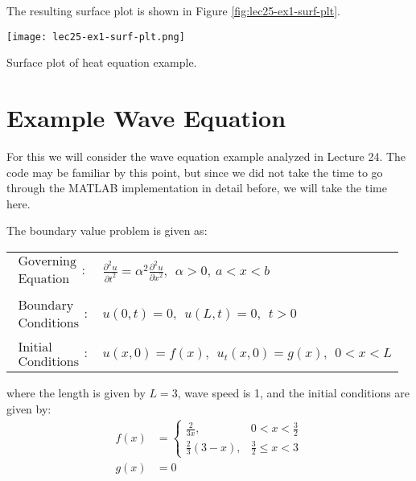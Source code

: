 \vspace{0.2cm}

\noindent The resulting surface plot is shown in Figure \ref{fig:lec25-ex1-surf-plt}.

\begin{marginfigure}
\texttt{[image: lec25-ex1-surf-plt.png]}
\caption{Surface plot of heat equation example.}
\label{fig:lec25-ex1-surf-plt}
\end{marginfigure}

\section{Example Wave Equation}

For this we will consider the wave equation example analyzed in Lecture 24.  The code may be familiar by this point, but since we did not take the time to go through the MATLAB implementation in detail before, we will take the time here.

\vspace{3.0cm}

\noindent The boundary value problem is given as:
\begin{table}
\begin{tabular}{l l}
$\substack{\text{Governing} \\\text{Equation}}: $& $\frac{\partial^2 u}{\partial t^2} = \alpha^2 \frac{\partial^2 u}{\partial x^2}, \ \ \alpha > 0, \ a<x<b$  \\
& \\
$\substack{\text{Boundary} \\ \text{Conditions}}: $& $u(0,t)=0, \ \ u(L,t) = 0, \ \ t>0$\\
& \\
$\substack{\text{Initial} \\ \text{Conditions}}: $ & $u(x,0) = f(x), \ \ u_{t}(x,0) = g(x), \ \ 0<x<L $ \\
\end{tabular}
\end{table}
where the length is given by $L=3$, wave speed is 1, and the initial conditions are given by:
\begin{align*}
f(x) &= \begin{cases} \frac{2}{3x}, & 0 < x < \frac{3}{2} \\ \frac{2}{3}(3-x), & \frac{3}{2} \le x < 3 \end{cases} \\
g(x) &= 0
\end{align*}

